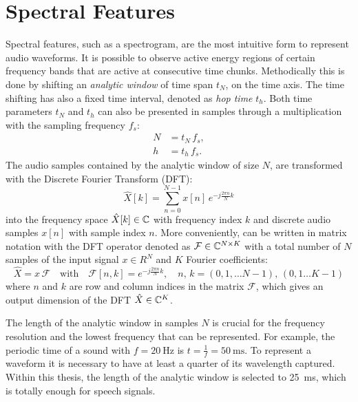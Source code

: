 
\section{Spectral Features}\label{sec:signal_spec}
\thesisStateReady
Spectral features, such as a spectrogram, are the most intuitive form to represent audio waveforms. 
It is possible to observe active energy regions of certain frequency bands that are active at consecutive time chunks.
Methodically this is done by shifting an \emph{analytic window} of time span $t_N$, on the time axis.
The time shifting has also a fixed time interval, denoted as \emph{hop time} $t_{h}$.
Both time parameters $t_N$ and $t_h$ can also be presented in samples through a multiplication with the sampling frequency $f_s$:
\begin{equation}
  \begin{split}
    N &= t_N \, f_s, \\
    h &= t_h \, f_s.
  \end{split}
\end{equation}
The audio samples contained by the analytic window of size $N$, are transformed with the Discrete Fourier Transform (DFT):
\begin{equation}\label{eq:signal_spec_dtft}
  \hat{X}[k] = \sum_{n=0}^{N-1} x[n] \, e^{-j\frac{2 \pi n}{N}k}
\end{equation}
into the frequency space $\hat{X}[k] \in \mathbb{C}$ with frequency index $k$ and discrete audio samples $x[n]$ with sample index $n$.
More conveniently,  can be written in matrix notation with the DFT operator denoted as $\mathcal{F} \in \mathbb{C}^{N \times K}$ with a total number of $N$ samples of the input signal $x \in R^N$ and $K$ Fourier coefficients:
\begin{equation}\label{eq:signal_spec_dtft_matrix}
  \hat{X} = x \, \mathcal{F} \quad \mathrm{with} 
  \quad \mathcal{F}[n, k] = e^{-j\frac{2 \pi n}{N} k},
  \quad n,\, k = (0, 1, \dots N-1),\, (0, 1 \dots K-1)
\end{equation}
where $n$ and $k$ are row and column indices in the matrix $\mathcal{F}$, which gives an output dimension of the DFT $\hat{X} \in \mathbb{C}^K$.

The length of the analytic window in samples $N$ is crucial for the frequency resolution and the lowest frequency that can be represented.
For example, the periodic time of a sound with $f=\SI{20}{\hertz}$ is $t=\frac{1}{f} = \SI{50}{\milli\second}$.
To represent a waveform it is necessary to have at least a quarter of its wavelength captured.
Within this thesis, the length of the analytic window is selected to \SI{25}{\milli\second}, which is totally enough for speech signals.

